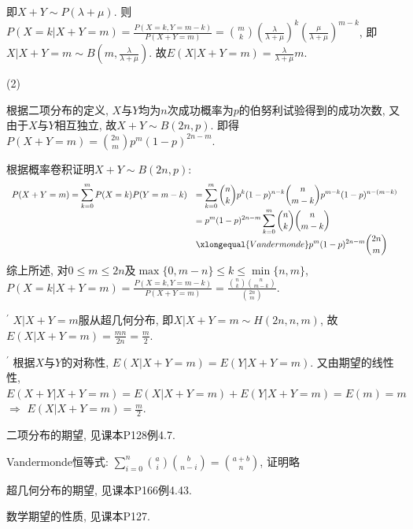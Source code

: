 \documentclass[standard]{ExBook}
\begin{document}
\begin{qitems}
即$X+Y\sim P(\lambda+\mu)$. 则$P(X = k|X + Y = m)=\displaystyle\frac{P(X=k,Y=m-k)}{P(X+Y=m)}=\binom{m}{k}\left(\frac{\lambda}{\lambda+\mu}\right)^{k}\left(\frac{\mu}{\lambda+\mu}\right)^{m-k}$, 即$X|X+Y=m\sim B(m,\displaystyle\frac{\lambda}{\lambda+\mu})$. 故$E(X|X+Y=m)=\displaystyle\frac{\lambda}{\lambda+\mu}m$.

(2)

 根据二项分布的定义, $X$与$Y$均为$n$次成功概率为$p$的伯努利试验得到的成功次数, 又由于$X$与$Y$相互独立, 故$X+Y\sim B(2n,p)$. 即得$P(X+Y=m)=\displaystyle\binom{2n}{m}p^m(1-p)^{2n-m}$.

 根据概率卷积证明$X+Y\sim B(2n,p)$:
$$
    \begin{array}{ll}
P(X+Y=m)=\displaystyle\sum\limits_{k=0}^{m}P(X=k)P(Y=m-k) & =\displaystyle\sum\limits_{k=0}^{m}\binom{n}{k}p^{k}(1-p)^{n-k}\binom{n}{m-k}p^{m-k}(1-p)^{n-(m-k)}\\
& =\displaystyle p^{m}(1-p)^{2n-m}\sum\limits_{k=0}^{m}\binom{n}{k}\binom{n}{m-k}\\
& \xlongequal{Vandermonde} \displaystyle p^{m}(1-p)^{2n-m}\binom{2n}{m}
    \end{array}
$$
综上所述, 对$0\leq m\leq2n$及$\max\{0,m-n\}\leq k\leq\min\{n,m\}$,
$
P(X=k|X+Y=m)
=\frac{P(X=k,Y=m-k)}{P(X+Y=m)}
=\frac{\binom{n}{k}\binom{n}{m-k}}{\binom{2n}{m}}.
$

$^{'}$ $X|X+Y=m$服从超几何分布, 即$X|X+Y=m\sim H(2n,n,m)$, 故$E(X|X+Y=m)=\displaystyle\frac{mn}{2n}=\frac{m}{2}$.

$^{'}$ 根据$X$与$Y$的对称性, $E(X|X+Y=m)=E(Y|X+Y=m)$. 又由期望的线性性, $E(X+Y|X+Y=m)=E(X|X+Y=m)+E(Y|X+Y=m)=E(m)=m$ $\Longrightarrow$ $E(X|X+Y=m)=\displaystyle\frac{m}{2}$.

\textcolor{themeColor}{\selectfont {} 二项分布的期望, 见课本P128例4.7.}

\vspace{0.5em}

\textcolor{themeColor}{\selectfont {} Vandermonde恒等式: $\displaystyle\sum\limits_{i=0}^{n}\binom{a}{i}\binom{b}{n-i}=\binom{a+b}{n}$, 证明略}

\vspace{0.5em}

\textcolor{themeColor}{\selectfont {} 超几何分布的期望, 见课本P166例4.43.}

\textcolor{themeColor}{\selectfont {} 数学期望的性质, 见课本P127.}

\vspace{2.5cm-5em}


\end{qitems}
\end{document}
